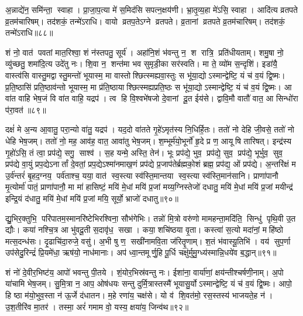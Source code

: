 अ॒न्नाद्ये॑न॒ समि॑न्ता॒ स्वाहा। प्रा॒जा॒प॒त्या मे॑ स॒मिद॑सि सपत्न॒क्षय॑णी। भ्रा॒तृ॒व्य॒हा मे॑ऽसि॒ स्वाहा। आदि॑त्य व्रतपते व्र॒तम॑चारिषम्। तद॑शकं॒ तन्मे॑ऽराधि। वायो व्रतप॒तेऽग्ने व्रतपते। व्र॒तानां व्रतपते व्र॒तम॑चारिषम्। तद॑शकं॒ तन्मे॑ऽराधि॥८८॥
\anuvakamend[स॒मित्समि॑न्धे व्र॒तं च॑रिष्या॒म्यायु॑षा॒ तेज॑सा॒ वर्च॑सा श्रि॒या यश॑सा ब्रह्मवर्च॒सेना॒ष्टौ च॑]


शं नो॒ वात॑ पवतां मात॒रिश्वा॒ शं न॑स्तपतु॒ सूर्य॑। अहा॑नि॒शं भ॑वन्तु न॒ श रात्रि॒ प्रति॑धीयताम्। शमु॒षा नो॒ व्यु॑च्छतु॒ शमा॑दि॒त्य उदे॑तु नः। शि॒वा न॒ शन्त॑मा भव सुमृडी॒का सर॑स्वति। मा ते॒ व्यो॑म स॒न्दृशि॑। इडा॑यै॒ वास्त्व॑सि वास्तु॒मद्वास्तु॒मन्तो॑ भूयास्म॒ मा वास्तोश्छित्स्मह्यवा॒स्तुः स भू॑या॒द्योऽस्मान्द्वेष्टि॒ यं च॑ व॒यं द्वि॒ष्मः। प्र॒ति॒ष्ठासि॑ प्रति॒ष्ठाव॑न्तो भूयास्म॒ मा प्र॑ति॒ष्ठायाश्छित्स्मह्यप्रति॒ष्ठः स भू॑या॒द्योऽस्मान्द्वेष्टि॒ यं च॑ व॒यं द्वि॒ष्मः। आ वा॑त वाहि भेष॒जं वि वा॑त वाहि॒ यद्रप॑। त्व हि वि॒श्वभे॑षजो दे॒वानां दू॒त ईय॑से। द्वावि॒मौ वातौ॑ वात॒ आ सिन्धो॑रा प॑रा॒वत॑॥८९॥

दक्षं॑ मे अ॒न्य आ॒वातु॒ परा॒न्यो वा॑तु॒ यद्रप॑। यद॒दो वा॑तते गृ॒हे॑ऽमृत॑स्य नि॒धिर्\mbox{}हि॒तः। ततो॑ नो देहि जी॒वसे॒ ततो॑ नो धेहि भेष॒जम्। ततो॑ नो॒ मह॒ आव॑ह॒ वात॒ आवा॑तु भेष॒जम्। श॒म्भूर्म॑यो॒भूर्नो॑ हृ॒दे प्र ण॒ आयूषि तारिषत्। इन्द्र॑स्य गृ॒हो॑ऽसि॒ तं त्वा॒ प्रप॑द्ये॒ सगु॒ साश्व॑। स॒ह यन्मे॒ अस्ति॒ तेन॑। भूः प्रप॑द्ये॒ भुव॒ प्रप॑द्ये॒ सुव॒ प्रप॑द्ये॒ भूर्भुव॒ सुव॒ प्रप॑द्ये वा॒युं प्रप॒द्येऽनार्तां दे॒वतां॒ प्रप॒द्येऽश्मा॑नमाख॒णं प्रप॑द्ये प्र॒जाप॑तेर्ब्रह्मको॒शं ब्रह्म॒ प्रप॑द्य॒ ओं प्रप॑द्ये। अ॒न्तरि॑क्षं म उ॒र्व॑न्तरं॑ बृ॒हद॒ग्नय॒ पर्व॑ताश्च॒ यया॒ वात॑ स्व॒स्त्या स्व॑स्ति॒मान्तया स्व॒स्त्या स्व॑स्ति॒मान॑सानि। प्राणा॑पानौ मृ॒त्योर्मा॑ पातं॒ प्राणा॑पानौ॒ मा मा॑ हासिष्टं॒ मयि॑ मे॒धां मयि॑ प्र॒जां मय्य॒ग्निस्तेजो॑ दधातु॒ मयि॑ मे॒धां मयि॑ प्र॒जां मयीन्द्र॑ इन्द्रि॒यं द॑धातु॒ मयि॑ मे॒धां मयि॑ प्र॒जां मयि॒ सूर्यो॒ भ्राजो॑ दधातु॥९०॥

द्यु॒भिर॒क्तुभि॒ परि॑पातम॒स्मानरि॑ष्टेभिरश्विना॒ सौभ॑गेभिः। तन्नो॑ मि॒त्रो वरु॑णो मामहन्ता॒मदि॑ति॒ सिन्धु॑ पृथि॒वी उ॒त द्यौः। कया॑ नश्चि॒त्र आ भु॑वदू॒ती स॒दावृ॑ध॒ सखा। कया॒ शचि॑ष्ठया वृ॒ता। कस्त्वा॑ स॒त्यो मदा॑नां॒ महि॑ष्ठो मत्स॒दन्ध॑सः। दृ॒ढाचि॑दा॒रुजे॒ वसु॑। अ॒भी षु ण॒ सखी॑नामवि॒ता ज॑रितॄ॒णाम्। श॒तं भ॑वास्यू॒तिभि॑। वय॑ सुप॒र्णा उप॑सेदु॒रिन्द्रं॑ प्रि॒यमे॑धा॒ ऋष॑यो॒ नाध॑मानाः। अप॑ ध्वा॒न्तमूर्णु॒हि पू॒र्धि चक्षु॑र्मुमु॒ग्ध्य॑स्मान्नि॒धये॑व ब॒द्धान्॥९१॥

शं नो॑ दे॒वीर॒भिष्ट॑य॒ आपो॑ भवन्तु पी॒तये। शं॒योर॒भिस्र॑वन्तु नः। ईशा॑ना॒ वार्या॑णां॒ क्षय॑न्तीश्चर्\mbox{}षणी॒नाम्। अ॒पो या॑चामि भेष॒जम्। सु॒मि॒त्रा न॒ आप॒ ओष॑धयः सन्तु दुर्मि॒त्रास्तस्मै॑ भूयासु॒र्योऽस्मान्द्वेष्टि॒ यं च॑ व॒यं द्वि॒ष्मः। आपो॒ हि ष्ठा म॑यो॒भुव॒स्ता न॑ ऊ॒र्जे द॑धातन। म॒हे रणा॑य॒ चक्ष॑से। यो व॑ शि॒वत॑मो॒ रस॒स्तस्य॑ भाजयते॒ह न॑। उ॒श॒तीरि॑व मा॒तर॑। तस्मा॒ अरं॑ गमाम वो॒ यस्य॒ क्षया॑य॒ जिन्व॑थ॥९२॥


